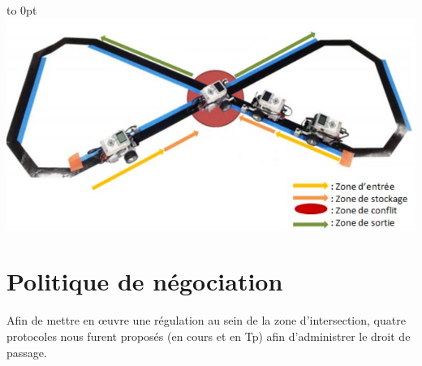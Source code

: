 \documentclass[french,a4paper,12pt]{report}
\begin{document}
\hfill\hbox to 0pt{\hss\includegraphics[width=15cm]{circuit.png}\hss}\hfill\null\newline

\chapter{Politique de négociation}
Afin de mettre en œuvre une régulation au sein de la zone d'intersection, quatre protocoles nous furent proposés (en cours et en Tp) afin d'administrer le droit de passage.
\end{document}
